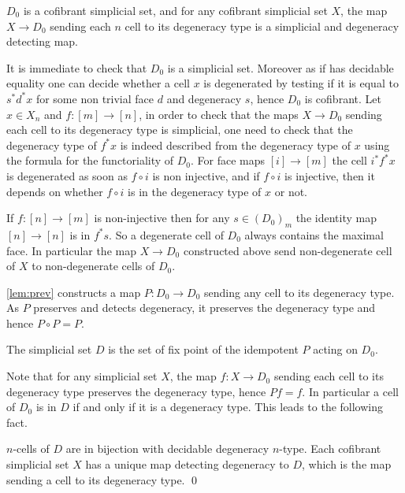 \documentclass[reqno,10pt,a4paper,oneside,draft]{amsart}
\makeatletter
\renewenvironment{proof}[1][\proofname] {\par\pushQED{\qed}\normalfont\topsep6\p@\@plus6\p@\relax\trivlist\item[\hskip\labelsep\bf#1\@addpunct{.}]\ignorespaces}{\popQED\endtrivlist\@endpefalse}
\numberwithin{equation}{section}
\theoremstyle{mythm}
\theoremstyle{mydef}
\theoremstyle{myrmk}
\newcommand{\co}{\colon}
\makeatother
\begin{document}
\begin{lemma} \label{lem:prev}
$D_0$ is a cofibrant simplicial set, and for any cofibrant simplicial set $X$, the map $X \rightarrow D_0$ sending each $n$ cell to its degeneracy type is a simplicial and degeneracy detecting map.
\end{lemma}

\begin{proof}
It is immediate to check that $D_0$ is a simplicial set. Moreover as if has decidable equality one can decide whether a cell $x$ is degenerated by testing if it is equal to $s^* d^* x$ for some non trivial face $d$ and degeneracy $s$, hence $D_0$ is cofibrant. Let $x \in X_n$ and $f:[m] \rightarrow [n]$, in order to check that the maps $X \rightarrow D_0$ sending each cell to its degeneracy type is simplicial, one need to check that the degeneracy type of $f^* x$ is indeed described from the degeneracy type of $x$ using the formula for the functoriality of $D_0$. For face maps $[i] \rightarrow [m]$ the cell $i^* f^* x$ is degenerated as soon as $f \circ i$ is non injective, and if $f\circ i$ is injective, then it depends on whether $f \circ i$ is in the degeneracy type of $x$ or not.

If $f:[n] \rightarrow [m]$ is non-injective then for any $s \in (D_0)_m$ the identity map $[n] \rightarrow [n]$ is in $f^* s$. So a degenerate cell of $D_0$ always contains the maximal face. In particular the map $X \rightarrow D_0$ constructed above send non-degenerate cell of $X$ to non-degenerate cells of $D_0$.
\end{proof}

\cref{lem:prev} constructs a map $P \co D_0 \rightarrow D_0$ sending any cell to its degeneracy type. As $P$ preserves and detects degeneracy, it preserves the degeneracy type and hence $P \circ P =P$.

\begin{definition}
The simplicial set $D$ is the set of fix point of the idempotent $P$ acting on $D_0$.
\end{definition}

Note that for any simplicial set $X$, the map $f:X \rightarrow D_0$ sending each cell to its degeneracy type preserves the degeneracy type, hence $P f = f$. In particular a cell of $D_0$ is in $D$ if and only if it is a degeneracy type. This leads to the following fact. 

\begin{lemma}
$n$-cells of $D$ are in bijection with decidable degeneracy $n$-type. Each cofibrant simplicial set $X$ has a unique map detecting degeneracy to $D$, which is the map sending a cell to its degeneracy type. \qed
\end{lemma}
\end{document}
